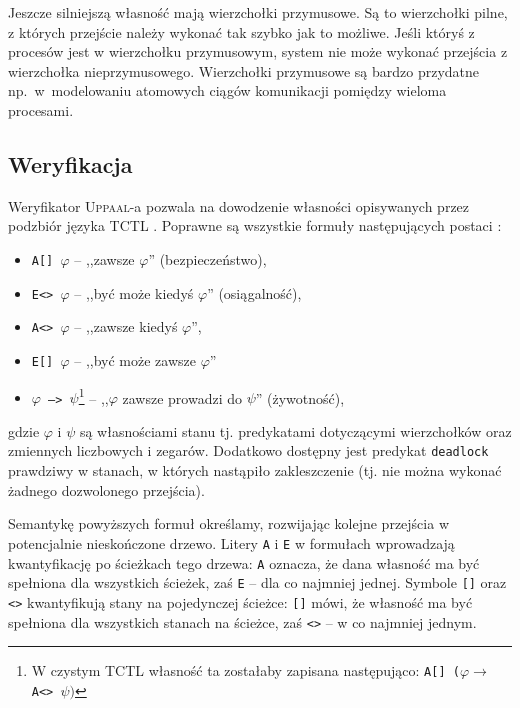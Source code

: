 \documentclass{pracamgr}
\newcommand{\upp}{\textsc{Uppaal}}
\theoremstyle{plain}
\begin{document}
Jeszcze silniejszą własność mają wierzchołki przymusowe. Są to
wierzchołki pilne, z których przejście należy wykonać tak szybko jak
to możliwe. Jeśli któryś z procesów jest w wierzchołku przymusowym,
system nie może wykonać przejścia z wierzchołka nieprzymusowego.
Wierzchołki przymusowe są bardzo przydatne np.~w~modelowaniu atomowych
ciągów komunikacji pomiędzy wieloma procesami.

\subsection{Weryfikacja}

Weryfikator \upp-a pozwala na dowodzenie własności opisywanych przez
podzbiór języka TCTL \cite{acd:mc}. Poprawne są wszystkie formuły
następujących postaci \cite{by-lncs04}:
\begin{itemize}
  \item \texttt{A[] $\varphi$} -- ,,zawsze $\varphi$'' (bezpieczeństwo),
  \item \texttt{E<> $\varphi$} -- ,,być może kiedyś $\varphi$''
  (osiągalność),
  \item \texttt{A<> $\varphi$} -- ,,zawsze kiedyś $\varphi$'',
  \item \texttt{E[] $\varphi$} -- ,,być może zawsze $\varphi$''
  \item \texttt{$\varphi$ --> $\psi$}\footnote{W czystym TCTL własność
    ta zostałaby zapisana następująco: \texttt{A[]
      ($\varphi\rightarrow$ A<> $\psi)$}} -- ,,$\varphi$ zawsze
  prowadzi do $\psi$'' (żywotność),
\end{itemize}
gdzie $\varphi$ i $\psi$ są własnościami stanu tj. predykatami
dotyczącymi wierzchołków oraz zmiennych liczbowych i zegarów.
Dodatkowo dostępny jest predykat \texttt{deadlock} prawdziwy w
stanach, w których nastąpiło zakleszczenie (tj. nie można wykonać
żadnego dozwolonego przejścia).


Semantykę powyższych formuł określamy, rozwijając kolejne
przejścia w potencjalnie nieskończone drzewo. Litery \texttt{A} i
\texttt{E} w formułach wprowadzają kwantyfikację po ścieżkach tego drzewa:
\texttt{A} oznacza, że dana własność ma być spełniona dla wszystkich
ścieżek, zaś \texttt{E} -- dla co najmniej jednej. Symbole
\texttt{[]} oraz \texttt{<>} kwantyfikują stany na pojedynczej
ścieżce: \texttt{[]} mówi, że własność ma być spełniona dla wszystkich
stanach na ścieżce, zaś \texttt{<>} -- w co najmniej jednym. 
\end{document}

